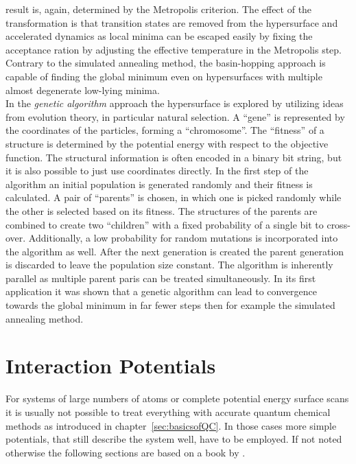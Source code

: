 result is, again, determined by the Metropolis criterion. The effect of the
transformation is that transition states are removed from the hypersurface and
accelerated dynamics as local minima can be escaped easily by fixing the
acceptance ration by adjusting the effective temperature in the Metropolis step.
Contrary to the simulated annealing method, the basin-hopping approach is
capable of finding the global minimum even on hypersurfaces with multiple almost
degenerate low-lying minima.
%
\\\newline
In the \textit{genetic algorithm}
approach\autocite{Goldberg_GeneticAlgorithmsSearch_1989} the hypersurface is
explored by utilizing ideas from evolution theory, in particular natural
selection. A ``gene'' is represented by the coordinates of the particles,
forming a ``chromosome''. The ``fitness'' of a structure is determined by the
potential energy with respect to the objective function. The structural
information is often encoded in a binary bit string, but it is also possible to
just use coordinates directly. In the first step of the algorithm an initial
population is generated randomly and their fitness is calculated. A pair of
``parents'' is chosen, in which one is picked randomly while the other is
selected based on its fitness. The structures of the parents are combined to
create two ``children'' with a fixed probability of a single bit to cross-over.
Additionally, a low probability for random mutations is incorporated into the
algorithm as well. After the next generation is created the parent generation is
discarded to leave the population size constant. The algorithm is inherently
parallel as multiple parent paris can be treated simultaneously. In its first
application it was shown that a genetic algorithm can lead to convergence
towards the global minimum in far fewer steps then for example the simulated
annealing method.\autocite{Hartke_Globalgeometryoptimization_1993}



\chapter{Interaction Potentials}
\label{sec:energylandscapes}

For systems of large numbers of atoms or complete potential energy surface
scans it is usually not possible to treat everything with accurate quantum
chemical methods as introduced in chapter~\ref{sec:basicsofQC}. In those cases
more simple potentials, that still describe the system well, have to be
employed. If not noted otherwise the following sections are based on a book by
\citeauthor{Hirschfelder_Moleculartheorygases_1964}.\autocite{Hirschfelder_Moleculartheorygases_1964} 

